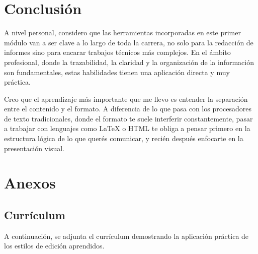 \documentclass[runningheads]{llncs}
\begin{document}
\section{Conclusión}

A nivel personal, considero que las herramientas incorporadas en este primer módulo van a ser clave a lo largo de toda la carrera, no solo para la redacción de informes sino para encarar trabajos técnicos más complejos. En el ámbito profesional, donde la trazabilidad, la claridad y la organización de la información son fundamentales, estas habilidades tienen una aplicación directa y muy práctica.

Creo que el aprendizaje más importante que me llevo es entender la separación entre el contenido y el formato. A diferencia de lo que pasa con los procesadores de texto tradicionales, donde el formato te suele interferir constantemente, pasar a trabajar con lenguajes como LaTeX o HTML te obliga a pensar primero en la estructura lógica de lo que querés comunicar, y recién después enfocarte en la presentación visual.
    

\section{Anexos}

\subsection{Currículum}
A continuación, se adjunta el currículum demostrando la aplicación práctica de los estilos de edición aprendidos.





\end{document}
